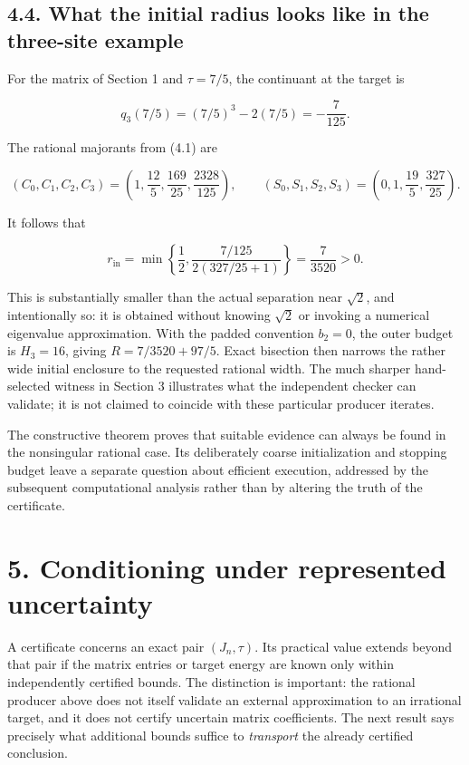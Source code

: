 \documentclass[
  11pt,
]{article}
\begin{document}
\subsection{4.4. What the initial radius looks like in the three-site
example}\label{what-the-initial-radius-looks-like-in-the-three-site-example}

For the matrix of Section 1 and \(\tau=7/5\), the continuant at the
target is

\[
q_3(7/5)=(7/5)^3-2(7/5)=-\frac7{125}.
\]

The rational majorants from (4.1) are

\[
(C_0,C_1,C_2,C_3)
=\left(1,\frac{12}{5},\frac{169}{25},\frac{2328}{125}\right),
\qquad
(S_0,S_1,S_2,S_3)
=\left(0,1,\frac{19}{5},\frac{327}{25}\right).
\tag{4.15}
\]

It follows that

\[
r_{\mathrm{in}}
=\min\left\{\frac12,
 \frac{7/125}{2(327/25+1)}\right\}
=\frac7{3520}>0.
\tag{4.16}
\]

This is substantially smaller than the actual separation near
\(\sqrt2\), and intentionally so: it is obtained without knowing
\(\sqrt2\) or invoking a numerical eigenvalue approximation. With the
padded convention \(b_2=0\), the outer budget is \(H_3=16\), giving
\(R=7/3520+97/5\). Exact bisection then narrows the rather wide initial
enclosure to the requested rational width. The much sharper
hand-selected witness in Section 3 illustrates what the independent
checker can validate; it is not claimed to coincide with these
particular producer iterates.

The constructive theorem proves that suitable evidence can always be
found in the nonsingular rational case. Its deliberately coarse
initialization and stopping budget leave a separate question about
efficient execution, addressed by the subsequent computational analysis
rather than by altering the truth of the certificate.

\section{5. Conditioning under represented
uncertainty}\label{conditioning-under-represented-uncertainty}

A certificate concerns an exact pair \((J_n,\tau)\). Its practical value
extends beyond that pair if the matrix entries or target energy are
known only within independently certified bounds. The distinction is
important: the rational producer above does not itself validate an
external approximation to an irrational target, and it does not certify
uncertain matrix coefficients. The next result says precisely what
additional bounds suffice to \emph{transport} the already certified
conclusion.
\end{document}

